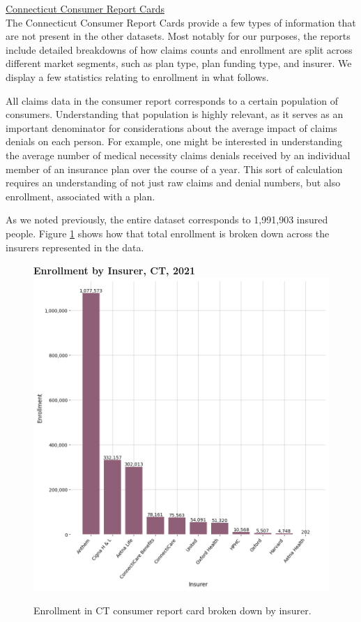 \documentclass[12pt, a4paper,twoside]{report}
\theoremstyle{plain} %
\theoremstyle{definition} %
\theoremstyle{remark} %
\numberwithin{equation}{chapter}
\begin{document}
		
		\underline{Connecticut Consumer Report Cards}\\
		
		The Connecticut Consumer Report Cards provide a few types of information that are not present in the other datasets. Most notably for our purposes, the reports include detailed breakdowns of how claims counts and enrollment are split across different market segments, such as plan type, plan funding type, and insurer. We display a few statistics relating to enrollment in what follows.
		
		All claims data in the consumer report corresponds to a certain population of consumers. Understanding that population is highly relevant, as it serves as an important denominator for considerations about the average impact of claims denials on each person. For example, one might be interested in understanding the average number of medical necessity claims denials received by an individual member of an insurance plan over the course of a year. This sort of calculation requires an understanding of not just raw claims and denial numbers, but also enrollment, associated with a plan.
		
		As we noted previously, the entire dataset corresponds to 1,991,903 insured people. Figure \ref{ctenrollmentbyinsurer} shows how that total enrollment is broken down across the insurers represented in the data.
		
		
		\begin{figure}[h!]
			\centering
			\textbf{Enrollment by Insurer, CT, 2021}
			\includegraphics[width=\columnwidth]{images/ct_claims/enrollment_by_insurer.png}
			\caption{Enrollment in CT consumer report card broken down by insurer.}
			\label{ctenrollmentbyinsurer}
		\end{figure}
		\clearpage
	
\end{document}
